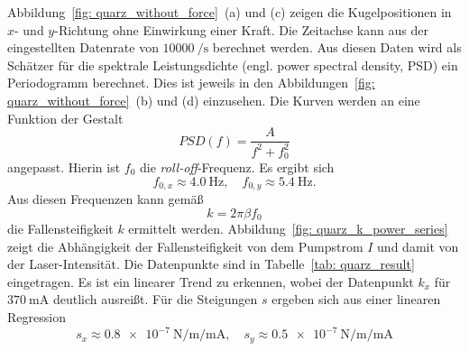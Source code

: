Abbildung~\ref{fig: quarz_without_force}~(a) und (c) zeigen die Kugelpositionen in $x$- und $y$-Richtung ohne Einwirkung
einer Kraft. %
Die Zeitachse kann aus der eingestellten Datenrate von $\SI{10000}{\per\second}$ berechnet werden.
Aus diesen Daten wird als Schätzer für die spektrale Leistungsdichte (engl. power spectral density, PSD)
ein Periodogramm berechnet. Dies ist jeweils in den Abbildungen~\ref{fig: quarz_without_force}~(b) und (d) einzusehen. Die Kurven werden
an eine Funktion der Gestalt
\begin{equation}
  PSD(f) = \frac{A}{f^2 + f_0^2}
  \label{eq: lorentz}
\end{equation}
angepasst. Hierin ist $f_0$ die \emph{roll-off}-Frequenz. Es ergibt sich
\begin{equation}
  f_{0, x} \approx \SI{4.0}{\hertz}, \quad f_{0, y} \approx \SI{5.4}{\hertz}.
\end{equation}
Aus diesen Frequenzen kann gemäß
\begin{equation}
  k = 2\pi \beta f_0
\end{equation}
die Fallensteifigkeit $k$ ermittelt werden. Abbildung~\ref{fig: quarz_k_power_series} zeigt die Abhängigkeit der Fallensteifigkeit von dem
Pumpstrom $I$ und damit von der Laser-Intensität. Die Datenpunkte sind in Tabelle~\ref{tab: quarz_result} eingetragen.
Es ist ein linearer Trend zu erkennen, wobei der Datenpunkt $k_x$
für $\SI{370}{\milli\ampere}$ deutlich ausreißt. Für die Steigungen $s$ ergeben sich aus einer linearen Regression
\begin{equation}
  s_x \approx \SI{0.8e-7}{\newton \per \meter \per \milli\ampere}, \quad  s_y \approx \SI{0.5e-7}{\newton \per \meter \per \milli\ampere}
\end{equation}
